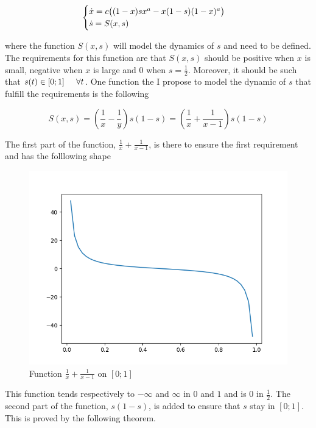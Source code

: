 \documentclass{article}
\begin{document}
\begin{equation}
\label{eq:1dtemp}
\begin{cases}
\dot{x} = c\big( (1-x)sx^a - x(1-s)(1-x)^a \big) \\
\dot{s} = S(x, s) \\
\end{cases}
\end{equation}

where the function $S(x,s)$ will model the dynamics of $s$ and need to be defined.
The requirements for this function are that $S(x,s)$ should be positive when $x$ is small, negative when $x$ is large and $0$ when $s = \frac{1}{2}$.
Moreover, it should be such that $s(t) \in [0;1] \hspace{0.5cm} \forall{t}$.
One function the I propose to model the dynamic of $s$ that fulfill the requirements is the following

\begin{equation}
\label{eq:sdyn}
S(x,s) = (\frac{1}{x}-\frac{1}{y})s(1-s) = (\frac{1}{x}+\frac{1}{x-1})s(1-s)
\end{equation}

The first part of the function, $\frac{1}{x}+\frac{1}{x-1}$, is there to ensure the first requirement and has the folllowing shape

\begin{figure}
\centering
\includegraphics[scale=0.5]{functionofs.png}
\caption{Function $\frac{1}{x}+\frac{1}{x-1}$ on $[0;1]$}
\label{fig:functionofs}
\end{figure}

This function tends respectively to $-\infty$ and $\infty$ in $0$ and $1$ and is $0$ in $\frac{1}{2}$.
The second part of the function, $s(1-s)$, is added to ensure that $s$ stay in $[0;1]$.
This is proved by the following theorem. \\
\end{document}
